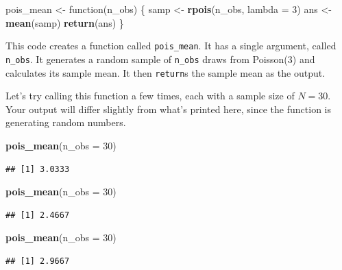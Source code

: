 \documentclass[12pt,oneside,openany]{tufte-book}
\newenvironment{Shaded}{}{}
\newcommand{\KeywordTok}[1]{\textcolor[rgb]{0.00,0.44,0.13}{\textbf{{#1}}}}
\newcommand{\DataTypeTok}[1]{\textcolor[rgb]{0.56,0.13,0.00}{{#1}}}
\newcommand{\DecValTok}[1]{\textcolor[rgb]{0.25,0.63,0.44}{{#1}}}
\newcommand{\StringTok}[1]{\textcolor[rgb]{0.25,0.44,0.63}{{#1}}}
\newcommand{\NormalTok}[1]{{#1}}
\begin{document}
\begin{Shaded}
\begin{Highlighting}[]
\NormalTok{pois_mean <-}\StringTok{ }\NormalTok{function(n_obs) \{}
    \NormalTok{samp <-}\StringTok{ }\KeywordTok{rpois}\NormalTok{(n_obs, }\DataTypeTok{lambda =} \DecValTok{3}\NormalTok{)}
    \NormalTok{ans <-}\StringTok{ }\KeywordTok{mean}\NormalTok{(samp)}
    \KeywordTok{return}\NormalTok{(ans)}
\NormalTok{\}}
\end{Highlighting}
\end{Shaded}

This code creates a function called \texttt{pois\_mean}. It has a single
argument, called \texttt{n\_obs}. It generates a random sample of
\texttt{n\_obs} draws from Poisson(3) and calculates its sample mean. It
then \texttt{return}s the sample mean as the output.

Let's try calling this function a few times, each with a sample size of
\(N = 30\). Your output will differ slightly from what's printed here,
since the function is generating random numbers.

\begin{Shaded}
\begin{Highlighting}[]
\KeywordTok{pois_mean}\NormalTok{(}\DataTypeTok{n_obs =} \DecValTok{30}\NormalTok{)}
\end{Highlighting}
\end{Shaded}

\begin{verbatim}
## [1] 3.0333
\end{verbatim}

\begin{Shaded}
\begin{Highlighting}[]
\KeywordTok{pois_mean}\NormalTok{(}\DataTypeTok{n_obs =} \DecValTok{30}\NormalTok{)}
\end{Highlighting}
\end{Shaded}

\begin{verbatim}
## [1] 2.4667
\end{verbatim}

\begin{Shaded}
\begin{Highlighting}[]
\KeywordTok{pois_mean}\NormalTok{(}\DataTypeTok{n_obs =} \DecValTok{30}\NormalTok{)}
\end{Highlighting}
\end{Shaded}

\begin{verbatim}
## [1] 2.9667
\end{verbatim}
\end{document}
